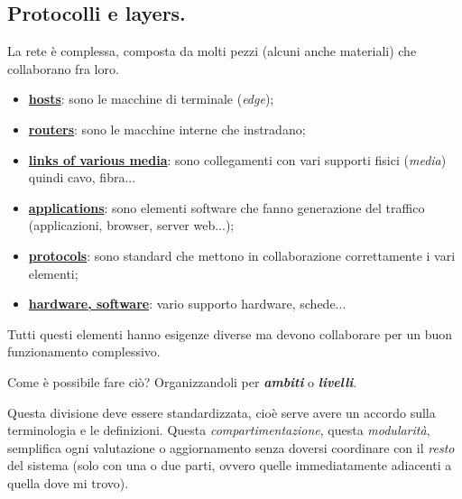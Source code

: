 \documentclass[10pt, a4paper, openany]{book}
\begin{document}
\subsection{Protocolli e layers.}
\noindent La rete è complessa, composta da molti pezzi (alcuni anche materiali) che collaborano fra loro.
\begin{itemize}
    \item \underline{\textbf{hosts}}: sono le macchine di terminale (\textit{edge});
    \item \underline{\textbf{routers}}: sono le macchine interne che instradano;
    \item \underline{\textbf{links of various media}}: sono collegamenti con vari supporti fisici (\textit{media}) quindi cavo, fibra...
    \item \underline{\textbf{applications}}: sono elementi software che fanno generazione del traffico (applicazioni, browser, server web...);
    \item \underline{\textbf{protocols}}: sono standard che mettono in collaborazione correttamente i vari elementi;
    \item \underline{\textbf{hardware, software}}: vario supporto hardware, schede...
\end{itemize}
\noindent Tutti questi elementi hanno esigenze diverse ma devono collaborare per un buon funzionamento complessivo. 

\noindent Come è possibile fare ciò? Organizzandoli per \textit{\textbf{ambiti}} o \textit{\textbf{livelli}}.

\noindent Questa divisione deve essere standardizzata, cioè serve avere un accordo sulla terminologia e le definizioni. Questa \textit{compartimentazione}, questa \textit{modularità}, semplifica ogni valutazione o aggiornamento senza doversi coordinare con il \textit{resto} del sistema (solo con una o due parti, ovvero quelle immediatamente adiacenti a quella dove mi trovo).
\end{document}
